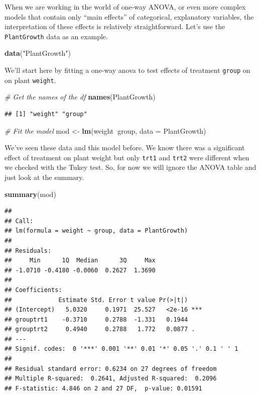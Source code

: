 \documentclass[
]{book}
\newenvironment{Shaded}{\begin{snugshade}}{\end{snugshade}}
\newcommand{\CommentTok}[1]{\textcolor[rgb]{0.56,0.35,0.01}{\textit{#1}}}
\newcommand{\DataTypeTok}[1]{\textcolor[rgb]{0.13,0.29,0.53}{#1}}
\newcommand{\KeywordTok}[1]{\textcolor[rgb]{0.13,0.29,0.53}{\textbf{#1}}}
\newcommand{\NormalTok}[1]{#1}
\newcommand{\OperatorTok}[1]{\textcolor[rgb]{0.81,0.36,0.00}{\textbf{#1}}}
\newcommand{\StringTok}[1]{\textcolor[rgb]{0.31,0.60,0.02}{#1}}
\begin{document}
When we are working in the world of one-way ANOVA, or even more complex models that contain only ``main effects'' of categorical, explanatory variables, the interpretation of these effects is relatively straightforward. Let's use the \texttt{PlantGrowth} data as an example.

\begin{Shaded}
\begin{Highlighting}[]
\KeywordTok{data}\NormalTok{(}\StringTok{"PlantGrowth"}\NormalTok{)}
\end{Highlighting}
\end{Shaded}

We'll start here by fitting a one-way anova to test effects of treatment \texttt{group} on on plant \texttt{weight}.

\begin{Shaded}
\begin{Highlighting}[]
\CommentTok{# Get the names of the df}
\KeywordTok{names}\NormalTok{(PlantGrowth)}
\end{Highlighting}
\end{Shaded}

\begin{verbatim}
## [1] "weight" "group"
\end{verbatim}

\begin{Shaded}
\begin{Highlighting}[]
\CommentTok{# Fit the model}
\NormalTok{mod <-}\StringTok{ }\KeywordTok{lm}\NormalTok{(weight}\OperatorTok{~}\NormalTok{group, }\DataTypeTok{data =}\NormalTok{ PlantGrowth)}
\end{Highlighting}
\end{Shaded}

We've seen these data and this model before. We know there was a significant effect of treatment on plant weight but only \texttt{trt1} and \texttt{trt2} were different when we checked with the Tukey test. So, for now we will ignore the ANOVA table and just look at the summary.

\begin{Shaded}
\begin{Highlighting}[]
\KeywordTok{summary}\NormalTok{(mod)}
\end{Highlighting}
\end{Shaded}

\begin{verbatim}
## 
## Call:
## lm(formula = weight ~ group, data = PlantGrowth)
## 
## Residuals:
##     Min      1Q  Median      3Q     Max 
## -1.0710 -0.4180 -0.0060  0.2627  1.3690 
## 
## Coefficients:
##             Estimate Std. Error t value Pr(>|t|)    
## (Intercept)   5.0320     0.1971  25.527   <2e-16 ***
## grouptrt1    -0.3710     0.2788  -1.331   0.1944    
## grouptrt2     0.4940     0.2788   1.772   0.0877 .  
## ---
## Signif. codes:  0 '***' 0.001 '**' 0.01 '*' 0.05 '.' 0.1 ' ' 1
## 
## Residual standard error: 0.6234 on 27 degrees of freedom
## Multiple R-squared:  0.2641,	Adjusted R-squared:  0.2096 
## F-statistic: 4.846 on 2 and 27 DF,  p-value: 0.01591
\end{verbatim}
\end{document}
